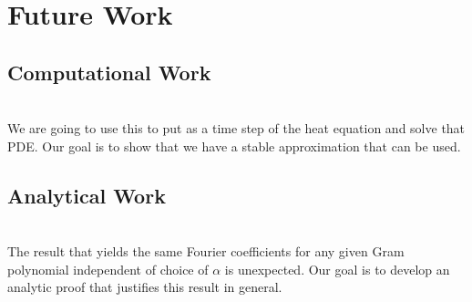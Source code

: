 \documentclass[11pt]{amsart}
\begin{document}
\section{Future Work}
\subsection{Computational Work} \\
We are going to use this to put as a time step of the heat equation and solve that PDE.  Our goal is to show that we have a stable approximation that can be used. 
\subsection{Analytical Work} \\
The result that yields the same Fourier coefficients for any given Gram polynomial independent of choice of $\alpha$ is unexpected.  Our goal is to develop an analytic proof that justifies this result in general. 
\end{document}
